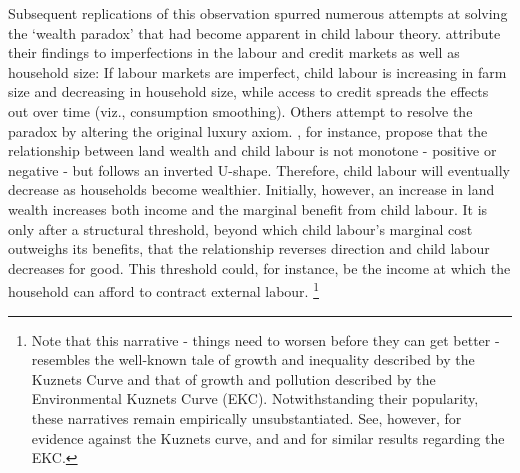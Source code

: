 \documentclass[a4paper,12pt]{article}
\theoremstyle{plain}
\theoremstyle{definition}
\theoremstyle{definition}
\theoremstyle{definition}
\theoremstyle{definition}
\begin{document}
Subsequent replications of this observation spurred numerous attempts at solving the `wealth paradox' that had become apparent in child labour theory. \citet{Bhalotra2003} attribute their findings to imperfections in the labour and credit markets as well as household size: If labour markets are imperfect, child labour is increasing in farm size and decreasing in household size, while access to credit spreads the effects out over time (viz., consumption smoothing). Others attempt to resolve the paradox by altering the original luxury axiom. \citet{Basu2010}, for instance, propose that the relationship between land wealth and child labour is not monotone - positive or negative - but follows an inverted U-shape. Therefore, child labour will eventually decrease as households become wealthier. Initially, however, an increase in land wealth increases both income and the marginal benefit from child labour. It is only after a structural threshold, beyond which child labour's marginal cost outweighs its benefits, that the relationship reverses direction and child labour decreases for good. This threshold could, for instance, be the income at which the household can afford to contract external labour. \footnote{Note that this narrative - things need to worsen before they can get better -  resembles the well-known tale of growth and inequality described by the Kuznets Curve \citep{Kuznets1955, Kuznets1963} and that of growth and pollution described by the Environmental Kuznets Curve (EKC). Notwithstanding their popularity, these narratives remain empirically unsubstantiated. See, however, \citet{Piketty2014} for evidence against the Kuznets curve, and \citet{Mills2009} and \citet{Ozokcu2017} for similar results regarding the EKC.} 
\end{document}
